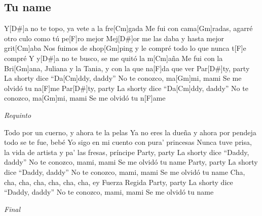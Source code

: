 \subsection{Tu name }

\noindent
\vspace{1cm}

\begin{guitar}
	\begin{multicols}{2}
		
		Y[D#]a no te topo, ya vete a la fre[Cm]gada
		Me fui con cama[Gm]radas, agarré otro culo como tú
		pe[F]ro mejor
		Mej[D#]or me las daba y hasta mejor grit[Cm]aba
		Nos fuimos de shop[Gm]ping y le compré todo lo que
		nunca t[F]e compré
		Y y[D#]a no te busco, se me quitó la m[Cm]aña
		Me fui con la Bri[Gm]ana, Juliana y la Tania, y con
		la que na[F]da que ver
		Par[D#]ty, party
		La shorty dice ``Da[Cm]ddy, daddy''
		No te conozco, ma[Gm]mi, mami
		Se me olvidó tu na[F]me
		Par[D#]ty, party
		La shorty dice ``Da[Cm]ddy, daddy''
		No te conozco, ma[Gm]mi, mami
		Se me olvidó tu n[F]ame
	\par
	\textit{Requinto}
	\par

	Todo por un cuerno, y ahora te la pelas
	Ya no eres la dueña y ahora por pendeja todo se
	te fue, bebé
	Yo sigo en mi cuento con pura' princesas
	Nunca tuve prisa, la vida de artista y pa' las
	fresas, príncipe
	Party, party
	La shorty dice ``Daddy, daddy''
	No te conozco, mami, mami
	Se me olvidó tu name
	Party, party
	La shorty dice ``Daddy, daddy''
	No te conozco, mami, mami
	Se me olvidó tu name
	Cha, cha, cha, cha, cha, cha, cha, ey
	Fuerza Regida
	Party, party
	La shorty dice ``Daddy, daddy''
	No te conozco, mami, mami
	Se me olvidó tu name
		\par
		\textit{Final}
	\end{multicols}
\end{guitar}
